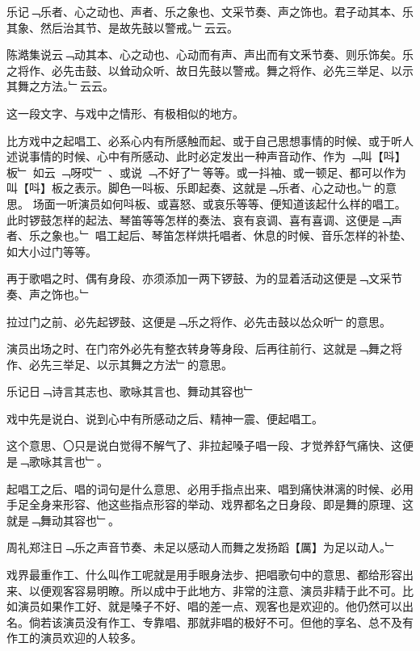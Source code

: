 \documentclass{zhvt-classic}
\begin{document}
\begin{preface}
乐记﹁乐者、心之动也、声者、乐之象也、文采节奏、声之饰也。君子动其本、乐其象、然后治其节、是故先鼓以警戒。﹂云云。
\end{preface}

\begin{preface}
陈澔集说云﹁动其本、心之动也、心动而有声、声出而有文釆节奏、则乐饰矣。乐之将作、必先击鼓、以耸动众听、故日先鼓以警戒。舞之将作、必先三举足、以示其舞之方法。﹂云云。
\end{preface}

这一段文字、与戏中之情形、有极相似的地方。

比方戏中之起唱工、必系心内有所感触而起、或于自己思想事情的时候、或于听人述说事情的时候、心中有所感动、此时必定发出一种声音动作、作为 ﹁叫【呌】板﹂ 如云 ﹁呀哎﹂ 、或说 ﹁不好了﹂等等。或一抖袖、或一顿足、都可以作为叫【呌】板之表示。脚色一呌板、乐即起奏、这就是﹁乐者、心之动也。﹂的意思。
场面一听演员如何呌板、或喜怒、或哀乐等等、便知道该起什么样的唱工。此时锣鼓怎样的起法、琴笛等等怎样的奏法、哀有哀调、喜有喜调、这便是﹁声者、乐之象也。﹂ 唱工起后、琴笛怎样烘托唱者、休息的时候、音乐怎样的补垫、如大小过门等等。

再于歌唱之时、偶有身段、亦须添加一两下锣鼓、为的显着活动这便是﹁文采节奏、声之饰也。﹂

拉过门之前、必先起锣鼓、这便是﹁乐之将作、必先击鼓以怂众听﹂的意思。

演员出场之时、在门帘外必先有整衣转身等身段、后再往前行、这就是﹁舞之将作、必先三举足、以示其舞之方法﹂的意思。

\begin{preface}
  乐记日﹁诗言其志也、歌咏其言也、舞动其容也﹂
\end{preface}

戏中先是说白、说到心中有所感动之后、精神一震、便起唱工。

这个意思、〇只是说白觉得不解气了、非拉起嗓子唱一段、才觉养舒气痛快、这便是﹁歌咏其言也﹂。

起唱工之后、唱的词句是什么意思、必用手指点出来、唱到痛快淋漓的时候、必用手足全身来形容、他这些指点形容的举动、戏界都名之日身段、即是舞的原理、这就是﹁舞动其容也﹂。

\begin{preface}
  周礼郑注日﹁乐之声音节奏、未足以感动人而舞之发扬蹈【厲】为足以动人。﹂
\end{preface}

戏界最重作工、什么叫作工呢就是用手眼身法步、把唱歌句中的意思、都给形容出来、以便观客容易明瞭。所以成中于此地方、非常的注意、演员非精于此不可。比如演员如果作工好、就是嗓子不好、唱的差一点、观客也是欢迎的。他仍然可以出名。倘若该演员没有作工、专靠唱、那就非唱的极好不可。但他的享名、总不及有作工的演员欢迎的人较多。
\end{document}
